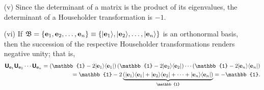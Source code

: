 \begin{itemize}
\item[(v)]
Since the determinant of a matrix is the product of its eigenvalues,
the determinant of a Householder transformation is $-1$.

\item[(vi)]
If
${\frak B}=\{{\bf e}_1,  {\bf e}_2, \ldots , {\bf e}_n\}\equiv \{\vert {\bf e}_1\rangle ,
\vert  {\bf e}_2\rangle , \ldots , \vert {\bf e}_n\rangle \}$
is an orthonormal basis, then the succession
of the respective Householder transformations renders negative unity; that is,
\begin{equation}
\begin{split}
\textsf{\textbf{U}}_{{\bf e}_1} \textsf{\textbf{U}}_{{\bf e}_2} \cdots \textsf{\textbf{U}}_{{\bf e}_n}
=
\left(\mathbb{1}- 2  \vert {\bf e}_1 \rangle \langle  {\bf e}_1  \vert\right)
\left(\mathbb{1}- 2  \vert {\bf e}_2 \rangle \langle  {\bf e}_2  \vert\right)
\cdots
\left(\mathbb{1}- 2  \vert {\bf e}_n \rangle \langle  {\bf e}_n  \vert\right) \\
=
\mathbb{1}- 2 \underbrace{\left( \vert {\bf e}_1 \rangle \langle  {\bf e}_1 \vert +
 \vert {\bf e}_2 \rangle \langle  {\bf e}_2  \vert +
\cdots
+  \vert {\bf e}_n \rangle \langle  {\bf e}_n  \vert\right)}_{\mathbb{1}}=
-\mathbb{1}.
\end{split}
\end{equation}
\end{itemize}




